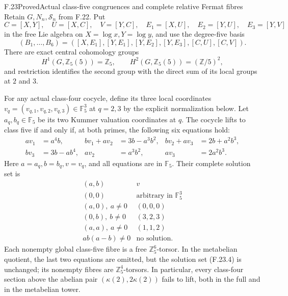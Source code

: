 \begin{statement}{F.23}{Proved}{Actual class-five congruences and complete relative Fermat fibres}
Retain \(G,N_n,\mathcal S_n\) from F.22. Put
\[
 C=[X,Y],\quad U=[X,C],\quad V=[Y,C],\quad
 E_1=[X,U],\quad E_2=[Y,U],\quad E_3=[Y,V]
\]
in the free Lie algebra on \(X=\log x,Y=\log y\), and use the
degree-five basis
\[
 (B_1,\ldots,B_6)=
 ([X,E_1],[Y,E_1],[Y,E_2],[Y,E_3],[C,U],[C,V]).
                                                               \tag{F.23.1}
\]
There are exact central cohomology groups
\[
 H^1(G,\mathbb Z_5(5))=\mathbb Z_5,\qquad
 H^2(G,\mathbb Z_5(5))=(\mathbb Z/5)^2,                         \tag{F.23.2}
\]
and restriction identifies the second group with the direct
sum of its local groups at \(2\) and \(3\).

For any actual class-four cocycle, define its three local
coordinates \(v_q=(v_{q,1},v_{q,2},v_{q,3})\in\mathbb F_5^3\)
at \(q=2,3\) by the explicit normalization below.
Let \(a_q,b_q\in\mathbb F_5\) be its two Kummer valuation
coordinates at \(q\). The cocycle lifts to class five if and
only if, at both primes, the following six equations hold:
\[
\begin{aligned}
 a v_1&=a^4b,&
 b v_1+a v_2&=3b-a^3b^2,&
 b v_2+a v_3&=2b+a^2b^3,\\
 b v_3&=3b-ab^4,&
 a v_2&=a^3b^2,&
 a v_3&=2a^2b^3 .
\end{aligned}                                                   \tag{F.23.3}
\]
Here \(a=a_q,b=b_q,v=v_q\), and all equations are in
\(\mathbb F_5\). Their complete solution set is
\[
\begin{array}{c|c}
(a,b)&v\\ \hline
(0,0)&\text{arbitrary in }\mathbb F_5^3\\
(a,0),\ a\ne0&(0,0,0)\\
(0,b),\ b\ne0&(3,2,3)\\
(a,a),\ a\ne0&(1,1,2)\\
ab(a-b)\ne0&\text{no solution}.
\end{array}                                                     \tag{F.23.4}
\]
Each nonempty global class-five fibre is a free
\(\mathbb Z_5^6\)-torsor. In the metabelian quotient,
the last two equations are omitted, but the solution set
(F.23.4) is unchanged; its nonempty fibres are
\(\mathbb Z_5^4\)-torsors. In particular, every class-four
section above the abelian pair
\((\kappa(2),2\kappa(2))\) fails to lift, both in the full
and in the metabelian tower.


\end{statement}
